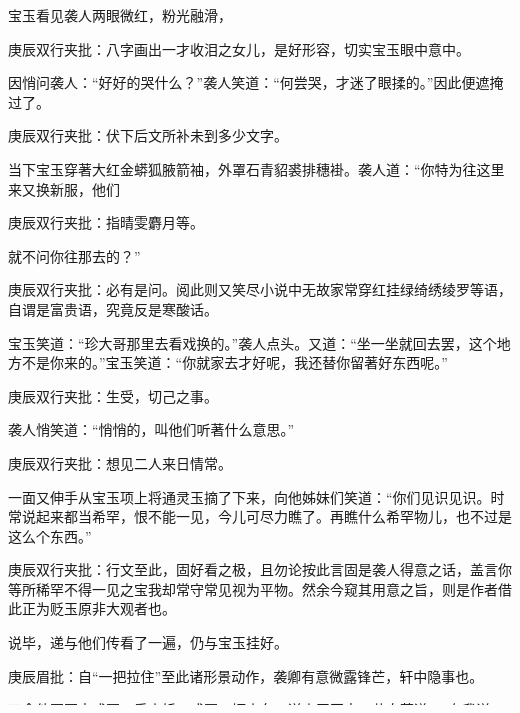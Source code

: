 \begin{parag}
    宝玉看见袭人两眼微红，粉光融滑，\begin{note}庚辰双行夹批：八字画出一才收泪之女儿，是好形容，切实宝玉眼中意中。\end{note}因悄问袭人：“好好的哭什么？”袭人笑道：“何尝哭，才迷了眼揉的。”因此便遮掩过了。\begin{note}庚辰双行夹批：伏下后文所补未到多少文字。\end{note}当下宝玉穿著大红金蟒狐腋箭袖，外罩石青貂裘排穗褂。袭人道：“你特为往这里来又换新服，他们\begin{note}庚辰双行夹批：指晴雯麝月等。\end{note}就不问你往那去的？”\begin{note}庚辰双行夹批：必有是问。阅此则又笑尽小说中无故家常穿红挂绿绮绣绫罗等语，自谓是富贵语，究竟反是寒酸话。\end{note}宝玉笑道：“珍大哥那里去看戏换的。”袭人点头。又道：“坐一坐就回去罢，这个地方不是你来的。”宝玉笑道：“你就家去才好呢，我还替你留著好东西呢。”\begin{note}庚辰双行夹批：生受，切己之事。\end{note}袭人悄笑道：“悄悄的，叫他们听著什么意思。”\begin{note}庚辰双行夹批：想见二人来日情常。\end{note}一面又伸手从宝玉项上将通灵玉摘了下来，向他姊妹们笑道：“你们见识见识。时常说起来都当希罕，恨不能一见，今儿可尽力瞧了。再瞧什么希罕物儿，也不过是这么个东西。”\begin{note}庚辰双行夹批：行文至此，固好看之极，且勿论按此言固是袭人得意之话，盖言你等所稀罕不得一见之宝我却常守常见视为平物。然余今窥其用意之旨，则是作者借此正为贬玉原非大观者也。\end{note}说毕，递与他们传看了一遍，仍与宝玉挂好。\begin{note}庚辰眉批：自“一把拉住”至此诸形景动作，袭卿有意微露锋芒，轩中隐事也。\end{note}又命他哥哥去或雇一乘小轿，或雇一辆小车，送宝玉回去。花自芳道：“有我送去，骑马也不妨了。”\begin{note}庚辰侧批：只知保重耳。\end{note}袭人道：“不为不妨，为的是碰见人。”\begin{note}庚辰双行夹批：细极！\end{note}
\end{parag}


\begin{parag}
    花自芳忙去雇了一顶小轿来，众人也不敢相留，只得送宝玉出去。袭人又抓果子与茗烟，又把些钱与他买花炮放，教他：“不可告诉人，连你也有不是。”一直送宝玉至门前，看著上轿，放下轿帘。花、茗二人牵马跟随。来至宁府街，茗烟命住轿，向花自芳道：“须等我同二爷还到东府里混一混，才过去的，不然人家就疑惑了。”花自芳听说有理，忙将宝玉抱出轿来，送上马去。宝玉笑说：“倒难为你了。”\begin{note}庚辰侧批：公子口气。\end{note}于是仍进后门来。俱不在话下。
\end{parag}


